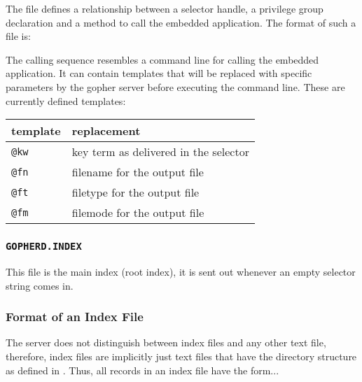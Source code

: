 The file  defines a relationship between
a selector handle, a privilege group declaration and a method
to call the embedded application.  The format of such a file is:


The calling sequence resembles a command line for calling the
embedded application.  It can contain templates that will be
replaced with specific parameters by the gopher server before
executing the command line.  These are currently defined templates:

\noindent\begin{center}
\begin{tabular}{|l|l|}\hline
template        & replacement                             \\ \hline\hline
{\tt @kw}       & key term as delivered in the selector         \\ \hline
{\tt @fn}       & filename for the output file                  \\ \hline
{\tt @ft}       & filetype for the output file                  \\ \hline
{\tt @fm}       & filemode for the output file                  \\ \hline
\end{tabular}
\end{center}




\subsubsection{{\tt GOPHERD.INDEX}}\label{rootindex}
 
  This file is the main index (root index), it is sent out whenever
  an empty selector string comes in.
 
 


\subsubsection{Format of an Index File}

  The server does not distinguish between index files and any other
  text file, therefore, index files are implicitly just text files that
  have the directory structure as defined in \cite{gophprot}.
  Thus, all records in an index file have the form...\\
\rule{0mm}{1mm}

